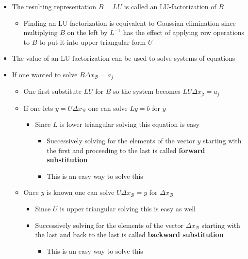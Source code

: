 \documentclass[11pt]{article}
\begin{document}
\begin{itemize}
\item The resulting representation \(B = LU\) is called an LU-factorization of \(B\)
\begin{itemize}
\item Finding an LU factorization is equivalent to Gaussian elimination since multiplying \(B\) on the left by \(L^{-1}\) has the effect of applying row operations to \(B\) to put it into upper-triangular form \(U\)
\end{itemize}

\item The value of an LU factorization can be used to solve systems of equations
\item If one wanted to solve \(B \Delta x_{\mathcal B} = a_j\)
\begin{itemize}
\item One first substitute \(LU\) for \(B\) so the system becomes \(LU \Delta x_{\beta} = a_j\)
\item If one lets \(y = U \Delta x_{\mathcal B}\) one can solve \(Ly=b\) for \(y\)
\begin{itemize}
\item Since \(L\) is lower triangular solving this equation is easy
\begin{itemize}
\item Successively solving for the elements of the vector \(y\) starting with the first and proceeding to the last is called \textbf{forward substitution}
\item This is an easy way to solve this
\end{itemize}
\end{itemize}
\item Once \(y\) is known one can solve \(U \Delta x_{\mathcal B} = y\) for \(\Delta x_ {\mathcal B}\)
\begin{itemize}
\item Since \(U\) is upper triangular solving this is easy as well
\item Successively solving for the elements of the vector \(\Delta x_{\mathcal B}\) starting with the last and back to the last is called \textbf{backward substitution}
\begin{itemize}
\item This is an easy way to solve this
\end{itemize}
\end{itemize}
\end{itemize}
\end{itemize}
\end{document}
